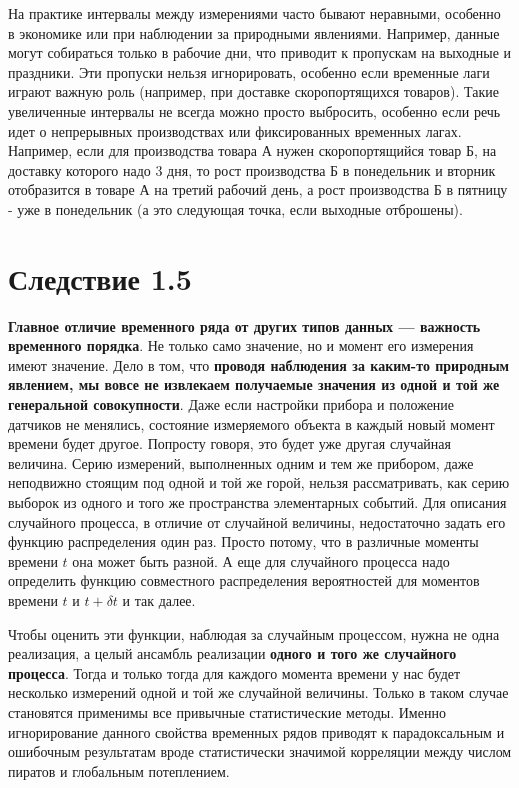 На практике интервалы между измерениями часто бывают неравными, особенно в
экономике или при наблюдении за природными явлениями. Например,
данные могут собираться только в рабочие дни, что приводит к
пропускам на выходные и праздники. Эти пропуски нельзя
игнорировать, особенно если временные лаги играют важную роль
(например, при доставке скоропортящихся товаров).
Такие увеличенные интервалы не всегда можно просто выбросить, особенно
если речь идет о непрерывных производствах или фиксированных временных лагах.
Например, если для производства товара А нужен скоропортящийся
товар Б, на доставку которого надо 3 дня, то рост производства Б в
понедельник и вторник отобразится в товаре А на третий рабочий
день, а рост производства Б в пятницу - уже в понедельник (а это
следующая точка, если выходные отброшены).

\section*{Следствие 1.5}
\textbf{Главное отличие временного ряда от других типов данных — важность
временного порядка}. Не только само значение, но и момент его
измерения имеют значение. Дело в том, что \textbf{проводя наблюдения за
  каким-то природным явлением, мы вовсе не
  извлекаем получаемые значения из одной и той же генеральной
совокупности}. Даже если
настройки прибора и положение датчиков не менялись, состояние
измеряемого объекта в каждый новый момент времени будет другое.
Попросту говоря, это будет уже другая случайная величина. Серию
измерений, выполненных одним и тем же прибором, даже неподвижно
стоящим под одной и той же горой, нельзя рассматривать, как серию
выборок из одного и того же пространства элементарных событий. Для
описания случайного процесса, в отличие от случайной величины,
недостаточно задать его функцию
распределения один раз. Просто потому, что в различные моменты времени
$t$ она может быть разной. А еще для случайного процесса надо
определить функцию совместного распределения вероятностей для
моментов времени $t$ и $t+\delta t$ и так далее.

Чтобы оценить эти функции, наблюдая за случайным процессом, нужна не
одна реализация, а целый
ансамбль реализации \textbf{одного и того же случайного процесса}. Тогда
и только тогда для каждого момента времени у нас будет несколько
измерений одной и той же случайной величины. Только в таком случае
становятся применимы все привычные статистические методы. Именно
игнорирование данного свойства временных рядов приводят к
парадоксальным и ошибочным результатам вроде статистически значимой корреляции
между числом пиратов и глобальным потеплением.

